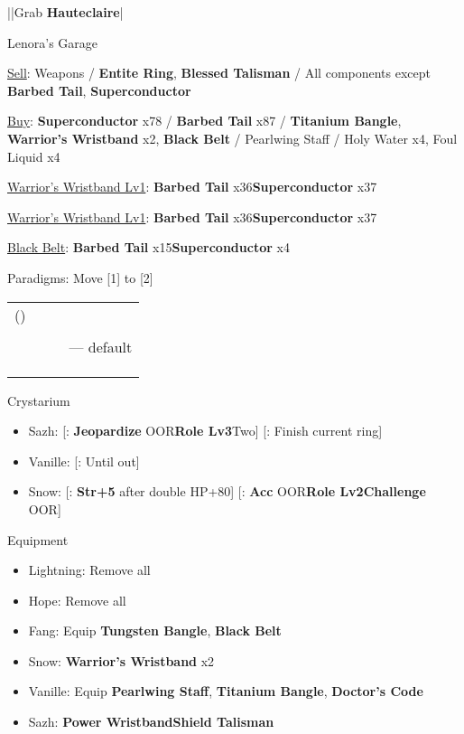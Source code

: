 \begin{mainlist}
	\item \skip|\skip|Grab \textbf{Hauteclaire}|\skip
\end{mainlist}
\begin{shop}{Lenora's Garage}
	\item \underline{Sell}: Weapons / \textbf{Entite Ring}, \textbf{Blessed Talisman} / All components except \textbf{Barbed Tail}, \textbf{Superconductor}
	\item \underline{Buy}: \textbf{Superconductor} x78 / \textbf{Barbed Tail} x87 / \textbf{Titanium Bangle}, \textbf{Warrior's Wristband} x2, \textbf{Black Belt} / Pearlwing Staff / Holy Water x4, Foul Liquid x4
\end{shop}
\begin{upgrade}
	\item \underline{Warrior's Wristband Lv1}: \textbf{Barbed Tail} x36\to \textbf{Superconductor} x37
	\item \underline{Warrior's Wristband Lv1}: \textbf{Barbed Tail} x36\to \textbf{Superconductor} x37
	\item \underline{Black Belt}: \textbf{Barbed Tail} x15\to \textbf{Superconductor} x4
\end{upgrade}
\begin{menu}
	\item Paradigms: Move [1] to [2]
	\begin{tabular}{cccl}
		(\syn) & \sab & \rav &             \\
		\com   & \med & \com &             \\
		\syn   & \med & \com & --- default \\
		\com   & \sab & \com &             \\
		\syn   & \sab & \com &             \\
		\com   & \rav & \com &
	\end{tabular}
	\item Crystarium
	\begin{itemize}
		\item Sazh: [\com: \textbf{Jeopardize} OOR\to \textbf{Role Lv3}\to Two] [\rav: Finish current ring]
		\item Vanille: [\med: Until out]
		\item Snow: [\rav: \textbf{Str+5} after double HP+80] [\sen: \textbf{Acc} OOR\to \textbf{Role Lv2}\to \textbf{Challenge} OOR]
	\end{itemize}
	\item Equipment
	\begin{itemize}
		\item Lightning: Remove all
		\item Hope: Remove all
		\item Fang: Equip \textbf{Tungsten Bangle}, \textbf{Black Belt}
		\item Snow: \textbf{Warrior's Wristband\star} x2
		\item Vanille: Equip \textbf{Pearlwing Staff}, \textbf{Titanium Bangle}, \textbf{Doctor's Code}
		\item Sazh: \textbf{Power Wristband}\to \textbf{Shield Talisman}
	\end{itemize}
\end{menu}
